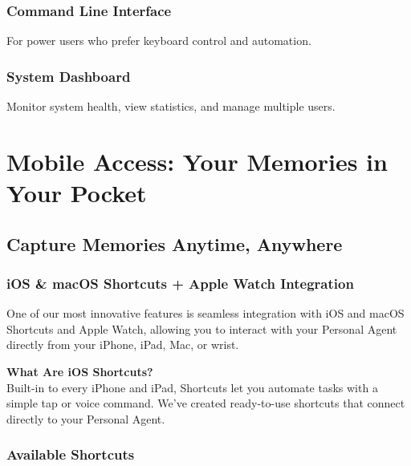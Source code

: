 \documentclass[11pt,letterpaper]{article}
\begin{document}
\subsubsection{Command Line Interface}
For power users who prefer keyboard control and automation.

\subsubsection{System Dashboard}
Monitor system health, view statistics, and manage multiple users.

\newpage
\section{Mobile Access: Your Memories in Your Pocket}

\subsection{Capture Memories Anytime, Anywhere}

\subsubsection{iOS \& macOS Shortcuts + Apple Watch Integration}

One of our most innovative features is seamless integration with iOS and macOS Shortcuts and Apple Watch, allowing you to interact with your Personal Agent directly from your iPhone, iPad, Mac, or wrist.

\textbf{What Are iOS Shortcuts?} \\
Built-in to every iPhone and iPad, Shortcuts let you automate tasks with a simple tap or voice command. We've created ready-to-use shortcuts that connect directly to your Personal Agent.

\subsubsection{Available Shortcuts}
\end{document}
